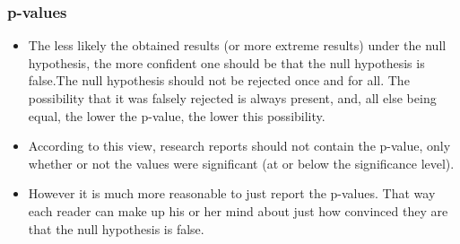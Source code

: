 ﻿\documentclass[a4]{beamer}
\begin{document}
\begin{frame}
\frametitle{p-values}
\begin{itemize}
\item The less likely the obtained results (or more extreme results) under the null hypothesis, the more confident one should be that the null hypothesis is false.The null hypothesis should not be rejected once and for all. The possibility that it was falsely rejected is always present, and, all else being equal, the lower the p-value, the lower this possibility.
\item According to this view, research reports should not contain the p-value, only whether or not the values were significant (at or below the significance level).
\item
However it is much more reasonable to just report the p-values. That way each reader can make up his or her mind about just how convinced they are that the null hypothesis is false.
\end{itemize}
\end{frame}
\end{document}
